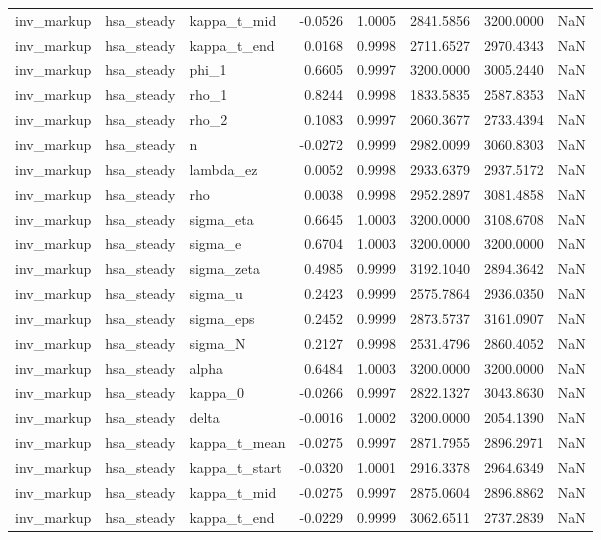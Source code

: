 \begin{tabular}{lllrrrrl}
inv\_markup & hsa\_steady & kappa\_t\_mid & -0.0526 & 1.0005 & 2841.5856 & 3200.0000 & NaN \\
inv\_markup & hsa\_steady & kappa\_t\_end & 0.0168 & 0.9998 & 2711.6527 & 2970.4343 & NaN \\
inv\_markup & hsa\_steady & phi\_1 & 0.6605 & 0.9997 & 3200.0000 & 3005.2440 & NaN \\
inv\_markup & hsa\_steady & rho\_1 & 0.8244 & 0.9998 & 1833.5835 & 2587.8353 & NaN \\
inv\_markup & hsa\_steady & rho\_2 & 0.1083 & 0.9997 & 2060.3677 & 2733.4394 & NaN \\
inv\_markup & hsa\_steady & n & -0.0272 & 0.9999 & 2982.0099 & 3060.8303 & NaN \\
inv\_markup & hsa\_steady & lambda\_ez & 0.0052 & 0.9998 & 2933.6379 & 2937.5172 & NaN \\
inv\_markup & hsa\_steady & rho & 0.0038 & 0.9998 & 2952.2897 & 3081.4858 & NaN \\
inv\_markup & hsa\_steady & sigma\_eta & 0.6645 & 1.0003 & 3200.0000 & 3108.6708 & NaN \\
inv\_markup & hsa\_steady & sigma\_e & 0.6704 & 1.0003 & 3200.0000 & 3200.0000 & NaN \\
inv\_markup & hsa\_steady & sigma\_zeta & 0.4985 & 0.9999 & 3192.1040 & 2894.3642 & NaN \\
inv\_markup & hsa\_steady & sigma\_u & 0.2423 & 0.9999 & 2575.7864 & 2936.0350 & NaN \\
inv\_markup & hsa\_steady & sigma\_eps & 0.2452 & 0.9999 & 2873.5737 & 3161.0907 & NaN \\
inv\_markup & hsa\_steady & sigma\_N & 0.2127 & 0.9998 & 2531.4796 & 2860.4052 & NaN \\
inv\_markup & hsa\_steady & alpha & 0.6484 & 1.0003 & 3200.0000 & 3200.0000 & NaN \\
inv\_markup & hsa\_steady & kappa\_0 & -0.0266 & 0.9997 & 2822.1327 & 3043.8630 & NaN \\
inv\_markup & hsa\_steady & delta & -0.0016 & 1.0002 & 3200.0000 & 2054.1390 & NaN \\
inv\_markup & hsa\_steady & kappa\_t\_mean & -0.0275 & 0.9997 & 2871.7955 & 2896.2971 & NaN \\
inv\_markup & hsa\_steady & kappa\_t\_start & -0.0320 & 1.0001 & 2916.3378 & 2964.6349 & NaN \\
inv\_markup & hsa\_steady & kappa\_t\_mid & -0.0275 & 0.9997 & 2875.0604 & 2896.8862 & NaN \\
inv\_markup & hsa\_steady & kappa\_t\_end & -0.0229 & 0.9999 & 3062.6511 & 2737.2839 & NaN \\

\end{tabular}
